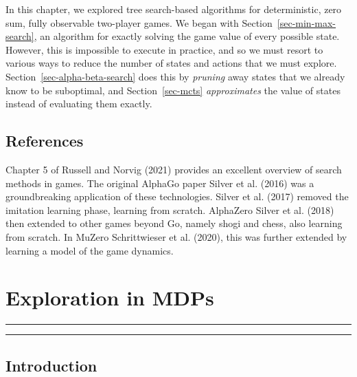 \documentclass[
  letterpaper,
  DIV=11,
  numbers=noendperiod]{scrreprt}
\theoremstyle{plain}
\theoremstyle{plain}
\theoremstyle{definition}
\theoremstyle{definition}
\theoremstyle{remark}
\begin{document}
In this chapter, we explored tree search-based algorithms for
deterministic, zero sum, fully observable two-player games. We began
with Section~\ref{sec-min-max-search}, an algorithm for exactly solving
the game value of every possible state. However, this is impossible to
execute in practice, and so we must resort to various ways to reduce the
number of states and actions that we must explore.
Section~\ref{sec-alpha-beta-search} does this by \emph{pruning} away
states that we already know to be suboptimal, and Section~\ref{sec-mcts}
\emph{approximates} the value of states instead of evaluating them
exactly.

\section{References}\label{references}

Chapter 5 of Russell and Norvig (2021) provides an excellent overview of
search methods in games. The original AlphaGo paper Silver et al. (2016)
was a groundbreaking application of these technologies. Silver et al.
(2017) removed the imitation learning phase, learning from scratch.
AlphaZero Silver et al. (2018) then extended to other games beyond Go,
namely shogi and chess, also learning from scratch. In MuZero
Schrittwieser et al. (2020), this was further extended by learning a
model of the game dynamics.


\chapter{Exploration in MDPs}\label{sec-exploration}

\begin{center}\rule{0.5\linewidth}{0.5pt}\end{center}

\begin{center}\rule{0.5\linewidth}{0.5pt}\end{center}

\providecommand{\hi}{h}
\providecommand{\hor}{H}
\providecommand{\kl}[2]{\mathrm{KL}\left(#1\parallel#2\right)}
\providecommand{\ind}[1]{\mathbf{1}\left\{#1\right\}}
\providecommand{\st}{s}
\providecommand{\act}{a}
\providecommand{\E}{\mathbb{E}}
\providecommand{\R}{\mathbb{R}}
\providecommand{\pr}{\mathbb{P}}

\section{Introduction}\label{introduction-9}
\end{document}
